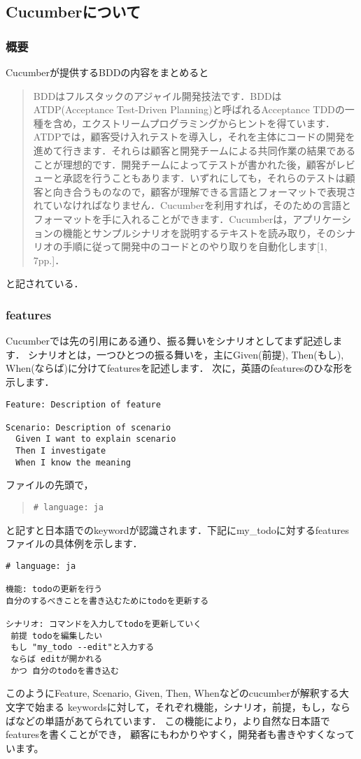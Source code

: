
\subsection{Cucumberについて}
\subsubsection{概要}
Cucumberが提供するBDDの内容をまとめると

\begin{quotation}
BDDはフルスタックのアジャイル開発技法です．BDDはATDP(Acceptance Test-Driven Planning)と呼ばれるAcceptance TDDの一種を含め，エクストリームプログラミングからヒントを得ています．ATDPでは，顧客受け入れテストを導入し，それを主体にコードの開発を進めて行きます．それらは顧客と開発チームによる共同作業の結果であることが理想的です．開発チームによってテストが書かれた後，顧客がレビューと承認を行うこともあります．いずれにしても，それらのテストは顧客と向き合うものなので，顧客が理解できる言語とフォーマットで表現されていなければなりません．Cucumberを利用すれば，そのための言語とフォーマットを手に入れることができます．Cucumberは，アプリケーションの機能とサンプルシナリオを説明するテキストを読み取り，そのシナリオの手順に従って開発中のコードとのやり取りを自動化します[1, 7pp.]．

\end{quotation}
と記されている．

\subsubsection{features}
Cucumberでは先の引用にある通り、振る舞いをシナリオとしてまず記述します．
シナリオとは，一つひとつの振る舞いを，主にGiven(前提), Then(もし), When(ならば)に分けてfeaturesを記述します．
次に，英語のfeaturesのひな形を示します．
\begin{lstlisting}[style=customRuby]
% cat ./featrues/sample_e.feature
Feature: Description of feature

Scenario: Description of scenario
  Given I want to explain scenario
  Then I investigate
  When I know the meaning
\end{lstlisting}
ファイルの先頭で，
\begin{quote}\begin{verbatim}
# language: ja
\end{verbatim}\end{quote}
と記すと日本語でのkeywordが認識されます．下記にmy\_todoに対するfeaturesファイルの具体例を示します．
\begin{lstlisting}[style=customCsh]
# language: ja

機能: todoの更新を行う
自分のするべきことを書き込むためにtodoを更新する

シナリオ: コマンドを入力してtodoを更新していく
 前提 todoを編集したい
 もし "my_todo --edit"と入力する
 ならば editが開かれる
 かつ 自分のtodoを書き込む
\end{lstlisting}
このようにFeature, Scenario, Given, Then, Whenなどのcucumberが解釈する大文字で始まる
keywordsに対して，それぞれ機能，シナリオ，前提，もし，ならばなどの単語があてられています．
この機能により，より自然な日本語でfeaturesを書くことができ，
顧客にもわかりやすく，開発者も書きやすくなっています。

